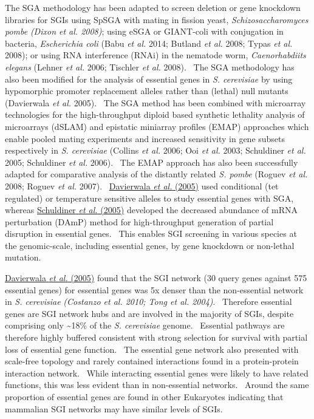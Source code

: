 The SGA methodology has been adapted to screen deletion or gene
knockdown libraries for SGIs using SpSGA with mating in fission yeast,
\textit{Schizosaccharomyces pombe }\textit{(Dixon et al. 2008)}; using
eSGA or GIANT-coli with conjugation in bacteria, \textit{Escherichia
coli} (Babu\textit{ et al.} 2014; Butland\textit{ et al.} 2008;
Typas\textit{ et al.} 2008); or using RNA interference (RNAi) in the
nematode worm, \textit{Caenorhabdiits elegans} (Lehner\textit{ et al.}
2006; Tischler\textit{ et al.} 2008). \ The SGA methodology has also
been modified for the analysis of essential genes in \textit{S.
cerevisiae} by using hypomorphic promoter replacement alleles rather
than (lethal) null mutants (Davierwala\textit{ et al.} 2005). \ The SGA
method has been combined with microarray technologies for the
high-throughput diploid based synthetic lethality analysis of
microarrays (dSLAM) and epistatic miniarray profiles (EMAP) approaches
which enable pooled mating experiments and increased sensitivity in
gene subsets respectively in \textit{S. cerevisiae} (Collins\textit{ et
al.} 2006; Ooi\textit{ et al.} 2003; Schuldiner\textit{ et al.} 2005;
Schuldiner\textit{ et al.} 2006). \ The EMAP approach has also been
successfully adapted for comparative analysis of the distantly related
\textit{S. pombe} (Roguev\textit{ et al.} 2008; Roguev\textit{ et al.}
2007). \ \hyperlink{ENREF28}{Davierwala}\hyperlink{ENREF28}{\textit{ et
al.}}\hyperlink{ENREF28}{ (2005)} used conditional (tet regulated) or
temperature sensitive alleles to study essential genes with SGA,
whereas \hyperlink{ENREF87}{Schuldiner}\hyperlink{ENREF87}{\textit{ et
al.}}\hyperlink{ENREF87}{ (2005)} developed the decreased abundance of
mRNA perturbation (DAmP) method for high-throughput generation of
partial disruption in essential genes. \ This enables SGI screening in
various species at the genomic-scale, including essential genes, by
gene knockdown or non-lethal mutation. \ 


\hyperlink{ENREF28}{Davierwala}\hyperlink{ENREF28}{\textit{ et
al.}}\hyperlink{ENREF28}{ (2005)} found that the SGI network (30 query
genes against 575 essential genes) for essential genes was 5x denser
than the non-essential network in \textit{S. cerevisiae
}\textit{(Costanzo et al. 2010; Tong et al. 2004)}. \ Therefore
essential genes are SGI network hubs and are involved in the majority
of SGIs, despite comprising only \~{}18\% of the \textit{S. cerevisiae}
genome. \ Essential pathways are therefore highly buffered consistent
with strong selection for survival with partial loss of essential gene
function. \ The essential gene network also presented with scale-free
topology and rarely contained interactions found in a protein-protein
interaction network. \ While interacting essential genes were likely to
have related functions, this was less evident than in non-essential
networks. \ Around the same proportion of essential genes are found in
other Eukaryotes indicating that mammalian SGI networks may have
similar levels of SGIs. \ 


